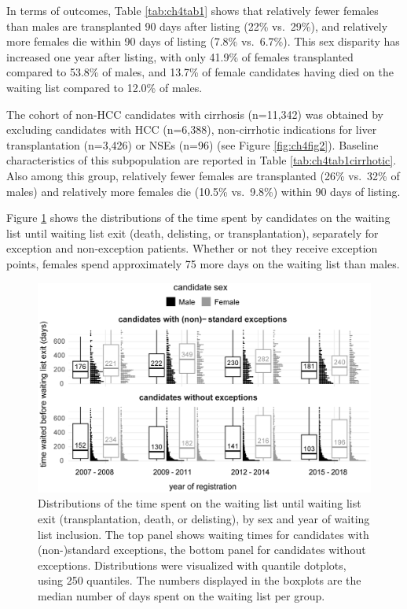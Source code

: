 \documentclass[11pt,twoside,]{book}
\begin{document}
\endgroup

\FloatBarrier

In terms of outcomes, Table \ref{tab:ch4tab1} shows that relatively fewer females
than males are transplanted 90 days after listing (22\% vs.~29\%), and relatively
more females die within 90 days of listing (7.8\% vs.~6.7\%). This sex disparity
has increased one year after listing, with only 41.9\% of females transplanted compared to
53.8\% of males, and 13.7\% of female candidates having died on the waiting list
compared to 12.0\% of males.

The cohort of non-HCC candidates with cirrhosis (n=11,342) was obtained by excluding
candidates with HCC (n=6,388), non-cirrhotic indications for liver
transplantation (n=3,426) or NSEs (n=96)
(see Figure \ref{fig:ch4fig2}). Baseline characteristics of this subpopulation
are reported in Table \ref{tab:ch4tab1cirrhotic}. Also among
this group, relatively fewer females are transplanted (26\% vs.~32\% of males) and
relatively more females die (10.5\% vs.~9.8\%) within 90 days of listing.

Figure \ref{fig:ch4fig3} shows the distributions of the time spent by candidates on the waiting list
until waiting list exit (death, delisting, or transplantation), separately for exception
and non-exception patients. Whether or not they receive exception points, females
spend approximately 75 more days on the waiting list than males.

\begin{figure}[ht]

{\centering \includegraphics[width=1\linewidth]{figures/ch4/fig3_waittime_at_exit} 

}

\caption{Distributions of the time spent on the waiting list until waiting list exit (transplantation, death, or delisting), by sex and year of waiting list inclusion. The top panel shows waiting times for candidates with (non-)standard exceptions, the bottom panel for candidates without exceptions. Distributions were
  visualized with quantile dotplots, using 250 quantiles. The numbers displayed in the boxplots are the median number of days spent on the waiting list per group.}\label{fig:ch4fig3}
\end{figure}
\end{document}
